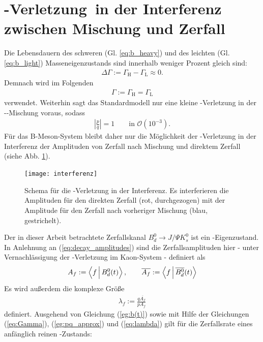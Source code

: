 \section[\CP-Verletzung in der Interferenz zwischen Mischung und Zerfall]{\boldmath\CP-Verletzung\ \unboldmath in der Interferenz zwischen Mischung und Zerfall}
Die Lebensdauern des schweren (Gl. \ref{eq:b_heavy}) und des leichten (Gl. \ref{eq:b_light}) Masseneigenzustands sind innerhalb weniger Prozent gleich sind:
\begin{align}
\Delta \Gamma := \Gamma_{\text{H}} - \Gamma_{\text{L}} \approx 0.
\end{align}
Demnach wird im Folgenden 
\begin{align}
\Gamma := \Gamma_{\text{H}} = \Gamma_{\text{L}} \label{eq:Gamma}
\end{align}
verwendet. Weiterhin sagt das Standardmodell nur eine kleine \CP-Verletzung in der \Bd-\Bdbar-Mischung voraus, sodass
\begin{align}
\left|\frac{p}{q}\right| = 1 \qquad \text{in } \mathcal{O}(10^{-3}). \label{eg:pq_approx}
\end{align}
Für das B-Meson-System bleibt daher nur die Möglichkeit der \CP-Verletzung in der Interferenz der Amplituden von Zerfall nach Mischung und direktem Zerfall (siehe Abb. \ref{fig:interferenz}). 
\begin{figure}[hptb]
\centering
\texttt{[image: interferenz]}
\caption{Schema für die \CP-Verletzung in der Interferenz. Es interferieren die Amplituden für den direkten Zerfall (rot, durchgezogen) mit der Amplitude für den Zerfall nach vorheriger Mischung (blau, gestrichelt).}
\label{fig:interferenz}
\end{figure}
Der in dieser Arbeit betrachtete Zerfallskanal $B_d^0 \rightarrow J/\Psi K_s^0$ ist ein \CP-Eigenzustand. In Anlehnung an (\ref{eq:decay_amplitudes}) sind die Zerfallsamplituden hier - unter Vernachlässigung der \CP-Verletzung im Kaon-System - definiert als
\begin{align}
\nonumber A_f := \Braket{f|\text{\Bd}(t)\vphantom{\text{\Bdbar}}}, \qquad \overline{A_{f}} := \Braket{f|\text{\Bdbar}(t)}
\end{align}
Es wird außerdem die komplexe Größe
\begin{align}
\lambda_f := \frac{q\overline{A_f}}{pA_f} \label{eq:lambda}
\end{align}
definiert. Ausgehend von Gleichung (\ref{eg:b(t)}) sowie mit Hilfe der Gleichungen (\ref{eq:Gamma}), (\ref{eg:pq_approx}) und (\ref{eq:lambda}) gilt für die Zerfallsrate eines anfänglich reinen \Bd-Zustands:
